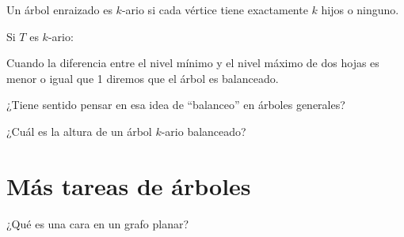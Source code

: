 \documentclass[../main.tex]{subfiles}
\begin{document}
Un árbol enraizado es $k$-ario si cada vértice tiene exactamente $k$ hijos o
ninguno.

\begin{figure}[H]
	\centering
	
\end{figure}

Si $T$ es $k$-ario:

Cuando la diferencia entre el nivel mínimo y el nivel máximo de dos hojas
es menor o igual que 1 diremos que el árbol es balanceado.

¿Tiene sentido pensar en esa idea de ``balanceo'' en árboles generales?

¿Cuál es la altura de un árbol $k$-ario balanceado?

\section{Más tareas de árboles}%
\label{sec:mas_tareas_de_arboles}

¿Qué es una cara en un grafo planar?
\end{document}
